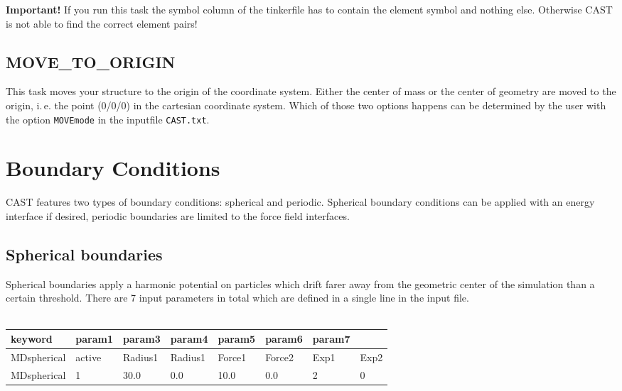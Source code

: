 \documentclass[10pt,a4paper]{article} %
\begin{document}
\textbf{Important!} If you run this task the symbol column of the tinkerfile has to contain the element symbol and nothing else. Otherwise CAST is not able to find the correct element pairs!

\subsection{MOVE\_TO\_ORIGIN}

This task moves your structure to the origin of the coordinate system. Either the center of mass or the center of geometry are moved to the origin, i.\,e. the point (0/0/0) in the cartesian coordinate system. Which of those two options happens can be determined by the user with the option \texttt{MOVEmode} in the inputfile \texttt{CAST.txt}.
		

	\section{Boundary Conditions}
	\label{sec:boundary}
	\ac{CAST} features two types of boundary conditions: spherical and periodic. Spherical boundary conditions can be applied with an energy interface if desired, periodic boundaries are limited to the force field interfaces.

	\subsection{Spherical boundaries}
	Spherical boundaries apply a harmonic potential on particles which drift farer away from the geometric center of the simulation than a certain threshold. There are 7 input parameters in total which are defined in a single line in the input file. \\~\\

	\begin{longtable}{l|l|l|l|l|l|l|l}
		keyword & param1 & param3 & param4 & param5 & param6 & param7 \\
		\hline
		MDspherical & active & Radius1 & Radius1 & Force1 & Force2 & Exp1 & Exp2 \\
		MDspherical & 1 & 30.0 & 0.0 & 10.0 & 0.0 & 2 & 0 \\
	\end{longtable}~\\
\end{document}
